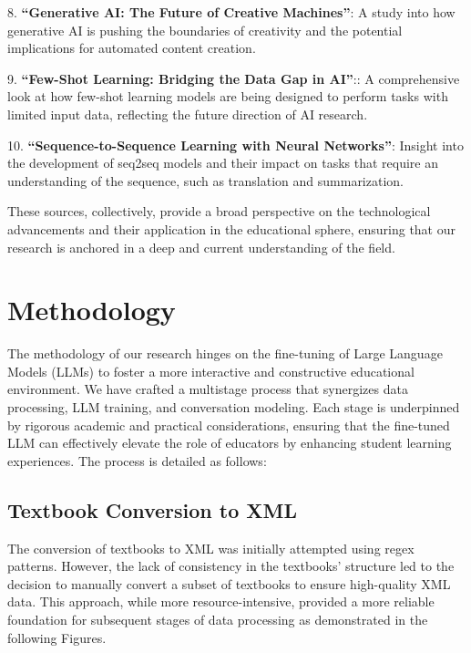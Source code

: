 \documentclass[]{article}
\begin{document}
8. \textbf{``Generative AI: The Future of Creative Machines''}:\cite{Göpfert} A study into how generative AI is pushing the boundaries of creativity and the potential implications for automated content creation.

9. \textbf{``Few-Shot Learning: Bridging the Data Gap in AI''}\cite{MeyerJ}:: A comprehensive look at how few-shot learning models are being designed to perform tasks with limited input data, reflecting the future direction of AI research.

10. \textbf{``Sequence-to-Sequence Learning with Neural Networks''}\cite{hilton2019ethics}: Insight into the development of seq2seq models and their impact on tasks that require an understanding of the sequence, such as translation and summarization.

These sources, collectively, provide a broad perspective on the technological advancements and their application in the educational sphere, ensuring that our research is anchored in a deep and current understanding of the field.

\section{Methodology}
\label{sec:methodology}
The methodology of our research hinges on the fine-tuning of Large Language Models (LLMs) to foster a more interactive and constructive educational environment. We have crafted a multistage process that synergizes data processing, LLM training, and conversation modeling. Each stage is underpinned by rigorous academic and practical considerations, ensuring that the fine-tuned LLM can effectively elevate the role of educators by enhancing student learning experiences. The process is detailed as follows:

\subsection{Textbook Conversion to XML}
The conversion of textbooks to XML was initially attempted using regex patterns. However, the lack of consistency in the textbooks' structure led to the decision to manually convert a subset of textbooks to ensure high-quality XML data. This approach, while more resource-intensive, provided a more reliable foundation for subsequent stages of data processing as demonstrated in the following Figures.
\end{document}
